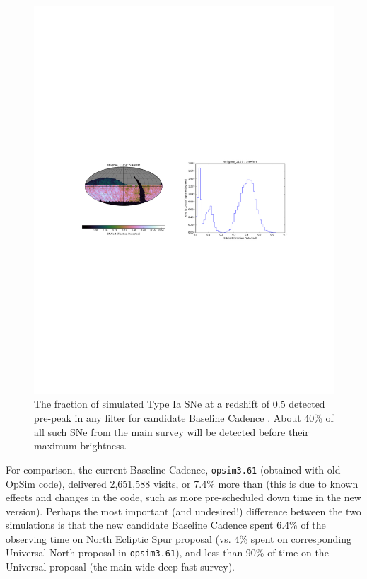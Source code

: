 \begin{figure}[t!]
\vskip -4.1in
\hskip -0.5in
\includegraphics[angle=0,width=1.19\hsize:,clip]{figs/enigma1189_earlySNe.pdf}
\vskip -4.0in
\caption{The fraction of simulated Type Ia SNe at a redshift of 0.5 detected
pre-peak in any filter for candidate Baseline Cadence . About
40\% of all such SNe from the main survey will be detected before their
maximum brightness.}
\label{fig:enigmaEarlySNe}
\end{figure}


For comparison, the current Baseline Cadence, \texttt{opsim3.61}
(obtained with old OpSim code), delivered 2,651,588 visits, or 7.4\%
more than   (this is due to known effects and
changes in the code,  such as more pre-scheduled down time in the new
version). Perhaps the most important (and undesired!) difference
between the two simulations is that the new candidate Baseline Cadence
spent 6.4\% of the observing time on North Ecliptic Spur proposal (vs.
4\% spent on corresponding Universal North proposal in
\texttt{opsim3.61}), and less than 90\% of time on the Universal
proposal (the main wide-deep-fast survey).

